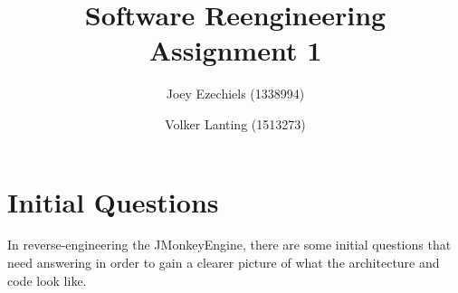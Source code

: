 \documentclass[a4paper, 10pt]{article}
\title{Software Reengineering\\
       Assignment 1}
\author{Joey Ezechiels (1338994) \and Volker Lanting (1513273)}
\begin{document}
\maketitle %

\newpage
\tableofcontents %


\newpage
{}
\section{Initial Questions}
\label{sec:initial_question}
In reverse-engineering the JMonkeyEngine, there are some initial
questions that need answering in order to gain a clearer picture
of what the architecture and code look like.


\end{document}
